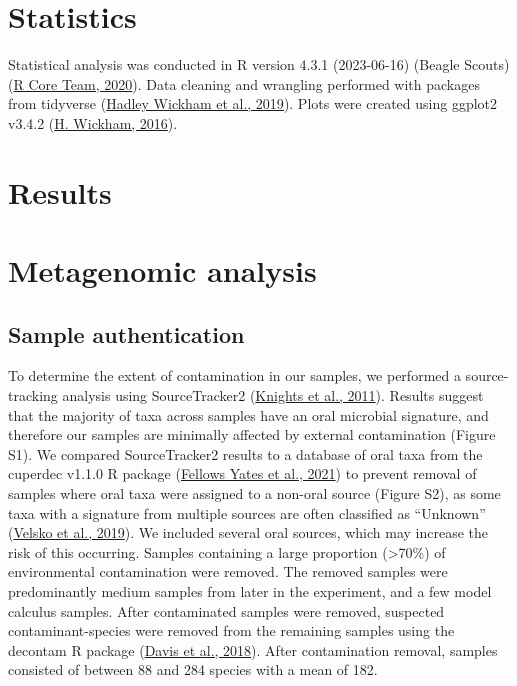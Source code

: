 \documentclass[
  letterpaper,
]{book}
\begin{document}
\hypertarget{statistics}{%
\section{Statistics}\label{statistics}}

Statistical analysis was conducted in R version 4.3.1 (2023-06-16)
(Beagle Scouts) (\protect\hyperlink{ref-Rbase}{R Core Team, 2020}). Data
cleaning and wrangling performed with packages from tidyverse
(\protect\hyperlink{ref-tidyverse2019}{Hadley Wickham et al., 2019}).
Plots were created using ggplot2 v3.4.2
(\protect\hyperlink{ref-ggplot2}{H. Wickham, 2016}).

\hypertarget{results}{%
\section{Results}\label{results}}

\hypertarget{metagenomic-analysis}{%
\section{Metagenomic analysis}\label{metagenomic-analysis}}

\hypertarget{sample-authentication}{%
\subsection{Sample authentication}\label{sample-authentication}}

To determine the extent of contamination in our samples, we performed a
source-tracking analysis using SourceTracker2
(\protect\hyperlink{ref-knightsSourceTracker2011}{Knights et al.,
2011}). Results suggest that the majority of taxa across samples have an
oral microbial signature, and therefore our samples are minimally
affected by external contamination (Figure S1). We compared
SourceTracker2 results to a database of oral taxa from the cuperdec
v1.1.0 R package
(\protect\hyperlink{ref-yatesOralMicrobiome2021}{Fellows Yates et al.,
2021}) to prevent removal of samples where oral taxa were assigned to a
non-oral source (Figure S2), as some taxa with a signature from multiple
sources are often classified as ``Unknown''
(\protect\hyperlink{ref-velskoMicrobialDifferences2019}{Velsko et al.,
2019}). We included several oral sources, which may increase the risk of
this occurring. Samples containing a large proportion (\textgreater70\%)
of environmental contamination were removed. The removed samples were
predominantly medium samples from later in the experiment, and a few
model calculus samples. After contaminated samples were removed,
suspected contaminant-species were removed from the remaining samples
using the decontam R package (\protect\hyperlink{ref-Rdecontam}{Davis et
al., 2018}). After contamination removal, samples consisted of between
88 and 284 species with a mean of 182.
\end{document}
